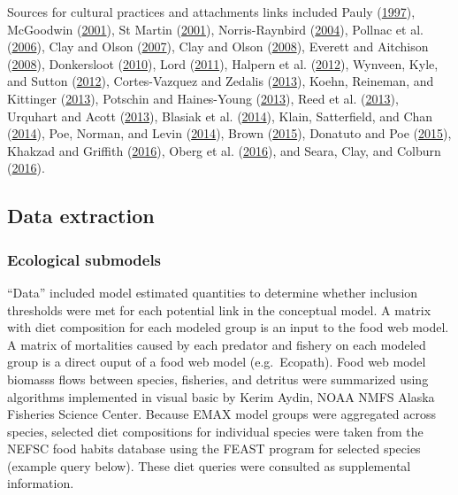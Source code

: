 \documentclass[
]{book}
\begin{document}
Sources for cultural practices and attachments links included Pauly (\protect\hyperlink{ref-pauly_putting_1997}{1997}), McGoodwin (\protect\hyperlink{ref-mcgoodwin_understanding_2001}{2001}), St Martin (\protect\hyperlink{ref-st_martin_making_2001}{2001}), Norris-Raynbird (\protect\hyperlink{ref-norris-raynbird_for_2004}{2004}), Pollnac et al. (\protect\hyperlink{ref-pollnac_toward_2006}{2006}), Clay and Olson (\protect\hyperlink{ref-clay_defining_2007}{2007}), Clay and Olson (\protect\hyperlink{ref-clay_definingfishing_2008}{2008}), Everett and Aitchison (\protect\hyperlink{ref-everett_role_2008}{2008}), Donkersloot (\protect\hyperlink{ref-donkersloot_politics_2010}{2010}), Lord (\protect\hyperlink{ref-lord_understanding_2011}{2011}), Halpern et al. (\protect\hyperlink{ref-halpern_index_2012}{2012}), Wynveen, Kyle, and Sutton (\protect\hyperlink{ref-wynveen_natural_2012}{2012}), Cortes-Vazquez and Zedalis (\protect\hyperlink{ref-cortes-vazquez_identity_2013}{2013}), Koehn, Reineman, and Kittinger (\protect\hyperlink{ref-koehn_progress_2013}{2013}), Potschin and Haines-Young (\protect\hyperlink{ref-potschin_landscapes_2013}{2013}), Reed et al. (\protect\hyperlink{ref-reed_beyond_2013}{2013}), Urquhart and Acott (\protect\hyperlink{ref-urquhart_constructing_2013}{2013}), Blasiak et al. (\protect\hyperlink{ref-blasiak_paradigms_2014}{2014}), Klain, Satterfield, and Chan (\protect\hyperlink{ref-klain_what_2014}{2014}), Poe, Norman, and Levin (\protect\hyperlink{ref-poe_cultural_2014}{2014}), Brown (\protect\hyperlink{ref-brown_we_2015}{2015}), Donatuto and Poe (\protect\hyperlink{ref-donatuto_evaluating_2015}{2015}), Khakzad and Griffith (\protect\hyperlink{ref-khakzad_role_2016}{2016}), Oberg et al. (\protect\hyperlink{ref-oberg_surviving_2016}{2016}), and Seara, Clay, and Colburn (\protect\hyperlink{ref-seara_perceived_2016}{2016}).

\hypertarget{data-extraction-10}{%
\subsection{Data extraction}\label{data-extraction-10}}

\hypertarget{ecological-submodels-1}{%
\subsubsection{Ecological submodels}\label{ecological-submodels-1}}

``Data'' included model estimated quantities to determine whether inclusion thresholds were met for each potential link in the conceptual model. A matrix with diet composition for each modeled group is an input to the food web model. A matrix of mortalities caused by each predator and fishery on each modeled group is a direct ouput of a food web model (e.g.~Ecopath). Food web model biomasss flows between species, fisheries, and detritus were summarized using algorithms implemented in visual basic by Kerim Aydin, NOAA NMFS Alaska Fisheries Science Center. Because EMAX model groups were aggregated across species, selected diet compositions for individual species were taken from the NEFSC food habits database using the FEAST program for selected species (example query below). These diet queries were consulted as supplemental information.
\end{document}
